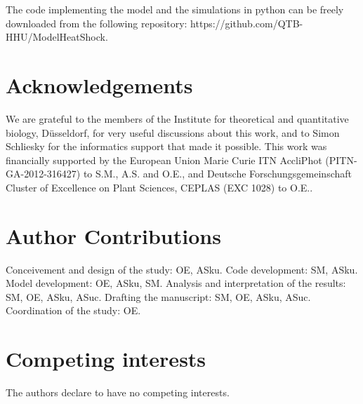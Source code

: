 \documentclass[oneside, 10pt, a4paper, twocolumn]{article}
\begin{document}
The code implementing the model and the simulations in python can be freely downloaded from the following repository: https://github.com/QTB-HHU/ModelHeatShock.


\section*{Acknowledgements}

We are grateful to the members of the Institute for theoretical and quantitative biology, Düsseldorf, for very useful discussions about this work, and to Simon Schliesky for the informatics support that made it possible.
This work was financially supported by the European Union Marie Curie ITN AccliPhot (PITN-GA-2012-316427) to S.M., A.S. and O.E., and Deutsche Forschungsgemeinschaft Cluster of Excellence on Plant Sciences, CEPLAS (EXC 1028) to O.E..

\section*{Author Contributions}

Conceivement and design of the study: OE, ASku. 
Code development: SM, ASku. 
Model development: OE, ASku, SM. 
Analysis and interpretation of the results: SM, OE, ASku, ASuc. 
Drafting the manuscript: SM, OE, ASku, ASuc. 
Coordination of the study: OE. 
 

\section*{Competing interests}

The authors declare to have no competing interests.







%




\clearpage
\end{document}
